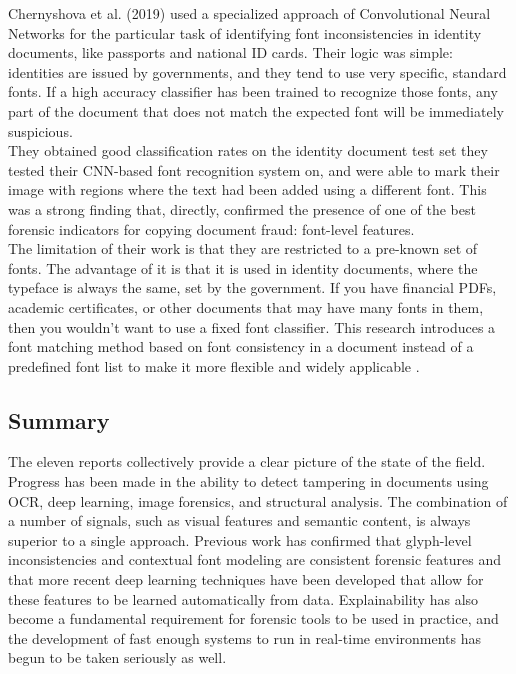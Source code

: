 \noindent Chernyshova et al. (2019) used a specialized approach of Convolutional Neural Networks for the particular task of identifying font inconsistencies in identity documents, like passports and national ID cards. Their logic was simple: identities are issued by governments, and they tend to use very specific, standard fonts. If a high accuracy classifier has been trained to recognize those fonts, any part of the document that does not match the expected font will be immediately suspicious.\\

\noindent They obtained good classification rates on the identity document test set they tested their CNN-based font recognition system on, and were able to mark their image with regions where the text had been added using a different font. This was a strong finding that, directly, confirmed the presence of one of the best forensic indicators for copying document fraud: font-level features.\\

\noindent The limitation of their work is that they are restricted to a pre-known set of fonts. The advantage of it is that it is used in identity documents, where the typeface is always the same, set by the government. If you have financial PDFs, academic certificates, or other documents that may have many fonts in them, then you wouldn't want to use a fixed font classifier. This research introduces a font matching method based on font consistency in a document instead of a predefined font list to make it more flexible and widely applicable \cite{Chernyshova2018Font}.\\

\subsection{Summary}

\noindent The eleven reports collectively provide a clear picture of the state of the field. Progress has been made in the ability to detect tampering in documents using OCR, deep learning, image forensics, and structural analysis. The combination of a number of signals, such as visual features and semantic content, is always superior to a single approach. Previous work has confirmed that glyph-level inconsistencies and contextual font modeling are consistent forensic features and that more recent deep learning techniques have been developed that allow for these features to be learned automatically from data. Explainability has also become a fundamental requirement for forensic tools to be used in practice, and the development of fast enough systems to run in real-time environments has begun to be taken seriously as well.\\

